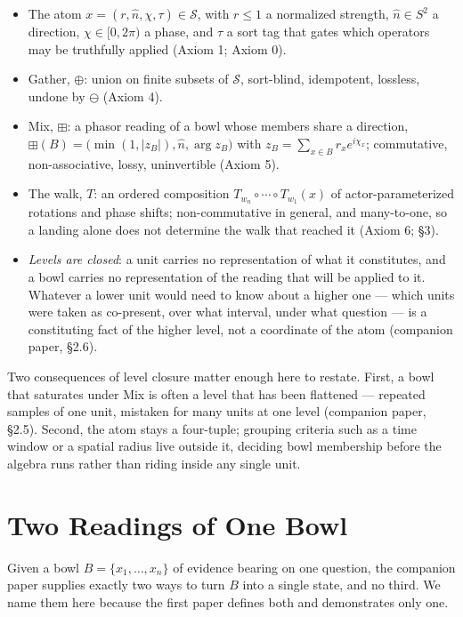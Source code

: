 \documentclass[12pt, a4paper]{article}
\begin{document}
\begin{itemize}
\item The atom $x=(r,\hat n,\chi,\tau)\in\mathcal{S}$, with $r\le 1$ a
      normalized strength, $\hat n\in S^2$ a direction, $\chi\in[0,2\pi)$
      a phase, and $\tau$ a sort tag that gates which operators may be
      truthfully applied (Axiom 1; Axiom 0).
\item Gather, $\oplus$: union on finite subsets of $\mathcal{S}$,
      sort-blind, idempotent, lossless, undone by $\ominus$ (Axiom 4).
\item Mix, $\boxplus$: a phasor reading of a bowl whose members share a
      direction, $\boxplus(B)=\bigl(\min(1,|z_B|),\hat n,\arg z_B\bigr)$
      with $z_B=\sum_{x\in B} r_x e^{i\chi_x}$; commutative,
      non-associative, lossy, uninvertible (Axiom 5).
\item The walk, $T$: an ordered composition
      $T_{w_n}\circ\cdots\circ T_{w_1}(x)$ of actor-parameterized
      rotations and phase shifts; non-commutative in general, and
      many-to-one, so a landing alone does not determine the walk that
      reached it (Axiom 6; \S3).
\item \emph{Levels are closed}: a unit carries no representation of
      what it constitutes, and a bowl carries no representation of the
      reading that will be applied to it. Whatever a lower unit would
      need to know about a higher one --- which units were taken as
      co-present, over what interval, under what question --- is a
      constituting fact of the higher level, not a coordinate of the
      atom (companion paper, \S2.6).
\end{itemize}

Two consequences of level closure matter enough here to restate. First,
a bowl that saturates under Mix is often a level that has been
flattened --- repeated samples of one unit, mistaken for many units at
one level (companion paper, \S2.5). Second, the atom stays a
four-tuple; grouping criteria such as a time window or a spatial
radius live outside it, deciding bowl membership before the algebra
runs rather than riding inside any single unit.

\section{Two Readings of One Bowl}
\label{sec:two_readings}

Given a bowl $B=\{x_1,\ldots,x_n\}$ of evidence bearing on one
question, the companion paper supplies exactly two ways to turn $B$
into a single state, and no third. We name them here because the
first paper defines both and demonstrates only one.
\end{document}
